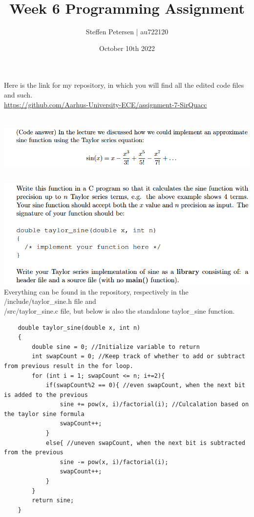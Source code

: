 \documentclass{article}
\title{Week 6 Programming Assignment}
\author{Steffen Petersen | au722120}
\date{October 10th 2022}
\begin{document}

\maketitle
\vspace{5pt}
\noindent Here is the link for my repository, in which you will find all the edited code files and such.\\
\url{https://github.com/Aarhus-University-ECE/assignment-7-SirQuacc}
\section{}
\includegraphics[width=\linewidth, keepaspectratio=true]{task1}
\subsection{}
\includegraphics[width=\linewidth, keepaspectratio=true]{task1a}
Everything can be found in the repository, respectively in the /include/taylor\_sine.h file and \\/src/taylor\_sine.c file, but below is also
the standalone taylor\_sine function.

\begin{lstlisting}
    double taylor_sine(double x, int n)
    {
        double sine = 0; //Initialize variable to return
        int swapCount = 0; //Keep track of whether to add or subtract from previous result in the for loop.
        for (int i = 1; swapCount <= n; i+=2){
            if(swapCount%2 == 0){ //even swapCount, when the next bit is added to the previous
                sine += pow(x, i)/factorial(i); //Culcalation based on the taylor sine formula
                swapCount++;
            }
            else{ //uneven swapCount, when the next bit is subtracted from the previous
                sine -= pow(x, i)/factorial(i);
                swapCount++;
            }
        }
        return sine;
    }
\end{lstlisting}
\end{document}
